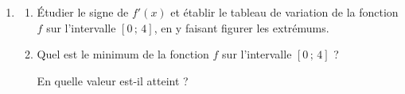 \documentclass[10pt]{article}
\begin{document}
\begin{enumerate}
\item[]
\begin{enumerate}[start=4]
\item Étudier le signe de $f'(x)$ et établir le tableau de variation de la fonction $f$ sur l'intervalle $[0\,;\,4]$, en y faisant figurer les extrémums.

\item Quel est le minimum de la fonction $f$ sur l'intervalle $[0\,;\,4]$ ?

En quelle valeur est-il atteint ?
\end{enumerate}
\end{enumerate}
\end{document}
